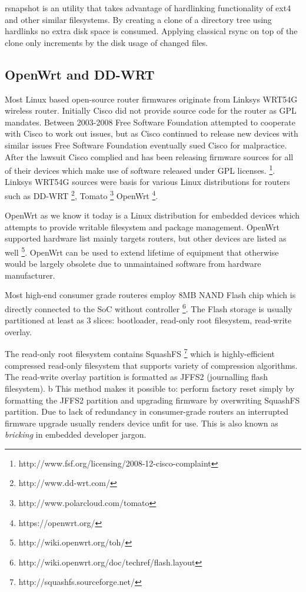 \documentclass[a4paper,11pt]{kth-mag}
\begin{document}
rsnapshot is an utility that takes advantage of hardlinking
functionality of ext4 and other similar filesystems.
By creating a clone of a directory tree using hardlinks no
extra disk space is consumed. Applying classical rsync on top of
the clone only increments by the disk usage of changed files.


\subsection{OpenWrt and DD-WRT}

Most Linux based open-source router firmwares originate from
Linksys WRT54G wireless router.
Initially Cisco did not provide source code for the router as GPL mandates.
Between 2003-2008 Free Software Foundation attempted to cooperate
with Cisco to work out issues, but as Cisco continued to release
new devices with similar issues Free Software Foundation eventually
sued Cisco for malpractice.
After the lawsuit Cisco complied and has been releasing firmware
sources for all of their devices which make use of software
released under GPL licenses.
\footnote{http://www.fsf.org/licensing/2008-12-cisco-complaint}.
Linksys WRT54G sources were basis for various Linux distributions for routers such as
DD-WRT \footnote{http://www.dd-wrt.com/},
Tomato \footnote{http://www.polarcloud.com/tomato}
OpenWrt \footnote{https://openwrt.org/}.

OpenWrt as we know it today is a Linux distribution for embedded devices
which attempts to provide writable filesystem and package management.
OpenWrt supported hardware list mainly targets routers, but other devices are
listed as well \footnote{http://wiki.openwrt.org/toh/}. OpenWrt can be used to
extend lifetime of equipment that otherwise would be largely obsolete due
to unmaintained software from hardware manufacturer.

Most high-end consumer grade routeres employ 8MB NAND Flash chip which is
directly connected to the SoC without controller
\footnote{http://wiki.openwrt.org/doc/techref/flash.layout}.
The Flash storage is usually partitioned at least as 3 slices:
bootloader, read-only root filesystem, read-write overlay.

The read-only root filesystem contains SquashFS
\footnote{http://squashfs.sourceforge.net/}
which is highly-efficient compressed read-only filesystem that
supports variety of compression algorithms.
The read-write overlay partition
is formatted as JFFS2 (journalling flash filesystem).
b
This method makes it possible to: perform factory reset simply by
formatting the JFFS2 partition and upgrading firmware by overwriting
SquashFS partition. Due to lack of redundancy in consumer-grade routers
an interrupted firmware upgrade usually renders device unfit for use.
This is also known as \emph{bricking} in embedded developer jargon.
\end{document}
